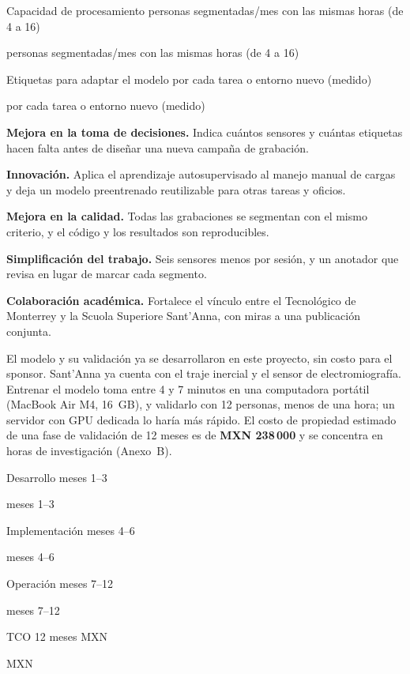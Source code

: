 \documentclass[letterpaper,11pt]{article}
\newcommand{\cifra}[5]{%
  \begingroup\setlength{\fboxsep}{5pt}%
  \colorbox{#1}{\parbox[t]{\dimexpr\linewidth-2\fboxsep\relax}{%
    \setstretch{1}\color{#2}{\Large\bfseries #3}\par
    #4%
    \ifx\relax#5\relax\else\par{\footnotesize #5}\fi}}%
  \endgroup}
\newcommand{\cifragris}[4]{\cifra{black!8}{black}{#1}{#2}{#3}}
\newcommand{\cifraacento}[4]{\cifra{blue!10}{blue!55!black}{#1}{#2}{#3}}
\begin{document}
\vspace{5pt}
\noindent
\begin{minipage}[t]{0.485\linewidth}\cifragris{+300\,\%}{Capacidad de procesamiento}{personas segmentadas/mes con las mismas horas (de 4 a 16)}{}\end{minipage}\hfill
\begin{minipage}[t]{0.485\linewidth}\cifraacento{$-$55\,\%}{Etiquetas para adaptar el modelo}{por cada tarea o entorno nuevo (medido)}{}\end{minipage}

\smallskip
\noindent{\footnotesize\textcolor{black!60}{Cálculo y supuestos en el Anexo~A. El tiempo de anotación es una estimación del equipo; la reducción de etiquetas se midió en el proyecto.}}
\medskip

\noindent\textbf{Mejora en la toma de decisiones.} Indica cuántos sensores y cuántas etiquetas hacen falta antes de diseñar una nueva campaña de grabación.\par
\smallskip
\noindent\textbf{Innovación.} Aplica el aprendizaje autosupervisado al manejo manual de cargas y deja un modelo preentrenado reutilizable para otras tareas y oficios.\par
\smallskip
\noindent\textbf{Mejora en la calidad.} Todas las grabaciones se segmentan con el mismo criterio, y el código y los resultados son reproducibles.\par
\smallskip
\noindent\textbf{Simplificación del trabajo.} Seis sensores menos por sesión, y un anotador que revisa en lugar de marcar cada segmento.\par
\smallskip
\noindent\textbf{Colaboración académica.} Fortalece el vínculo entre el Tecnológico de Monterrey y la Scuola Superiore Sant'Anna, con miras a una publicación conjunta.\par
\medskip

El modelo y su validación ya se desarrollaron en este proyecto, sin costo para el sponsor. Sant'Anna ya cuenta con el traje inercial y el sensor de electromiografía. Entrenar el modelo toma entre 4 y 7 minutos en una computadora portátil (MacBook Air M4, 16~GB), y validarlo con 12 personas, menos de una hora; un servidor con GPU dedicada lo haría más rápido. El costo de propiedad estimado de una fase de validación de 12 meses es de \textbf{MXN 238\,000} y se concentra en horas de investigación (Anexo~B).

\medskip
\noindent
\begin{minipage}[t]{0.235\linewidth}\cifragris{\$41\,k}{Desarrollo}{meses 1--3}{}\end{minipage}\hfill
\begin{minipage}[t]{0.235\linewidth}\cifragris{\$93\,k}{Implementación}{meses 4--6}{}\end{minipage}\hfill
\begin{minipage}[t]{0.235\linewidth}\cifragris{\$105\,k}{Operación}{meses 7--12}{}\end{minipage}\hfill
\begin{minipage}[t]{0.235\linewidth}\cifraacento{\$238\,k}{TCO 12 meses}{MXN}{}\end{minipage}
\medskip
\end{document}
